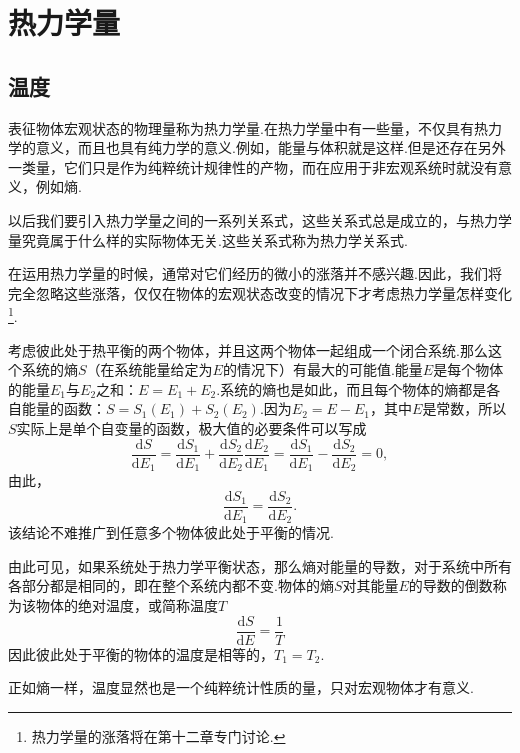 \chapter{热力学量}

\section{温度}

表征物体宏观状态的物理量称为热力学量.在热力学量中有一些量，不仅具有热力学的意义，而且也具有纯力学的意义.例如，能量与体积就是这样.但是还存在另外一类量，它们只是作为纯粹统计规律性的产物，而在应用于非宏观系统时就没有意义，例如熵.

以后我们要引入热力学量之间的一系列关系式，这些关系式总是成立的，与热力学量究竟属于什么样的实际物体无关.这些关系式称为热力学关系式.

在运用热力学量的时候，通常对它们经历的微小的涨落并不感兴趣.因此，我们将完全忽略这些涨落，仅仅在物体的宏观状态改变的情况下才考虑热力学量怎样变化\footnote{热力学量的涨落将在第十二章专门讨论.}.

考虑彼此处于热平衡的两个物体，并且这两个物体一起组成一个闭合系统.那么这个系统的熵$S$（在系统能量给定为$E$的情况下）有最大的可能值.能量$E$是每个物体的能量$E_1$与$E_2$之和：$E=E_1+E_2$.系统的熵也是如此，而且每个物体的熵都是各自能量的函数：$S=S_1(E_1)+S_2(E_2)$.因为$E_2=E-E_1$，其中$E$是常数，所以$S$实际上是单个自变量的函数，极大值的必要条件可以写成
\begin{equation*}
  \frac{\mathrm{d}S}{\mathrm{d}E_1}
  =\frac{\mathrm{d}S_1}{\mathrm{d}E_1}
  +\frac{\mathrm{d}S_2}{\mathrm{d}E_2}\frac{\mathrm{d}E_2}{\mathrm{d}E_1}
  =\frac{\mathrm{d}S_1}{\mathrm{d}E_1}
  -\frac{\mathrm{d}S_2}{\mathrm{d}E_2}=0,
\end{equation*}
由此，
\begin{equation*}
  \frac{\mathrm{d}S_1}{\mathrm{d}E_1}=\frac{\mathrm{d}S_2}{\mathrm{d}E_2}.
\end{equation*}
该结论不难推广到任意多个物体彼此处于平衡的情况.

由此可见，如果系统处于热力学平衡状态，那么熵对能量的导数，对于系统中所有各部分都是相同的，即在整个系统内都不变.物体的熵$S$对其能量$E$的导数的倒数称为该物体的绝对温度，或简称温度$T$
\begin{equation}
  \frac{\mathrm{d}S}{\mathrm{d}E}=\frac{1}{T}
\end{equation}
因此彼此处于平衡的物体的温度是相等的，$T_1=T_2$.

正如熵一样，温度显然也是一个纯粹统计性质的量，只对宏观物体才有意义.

